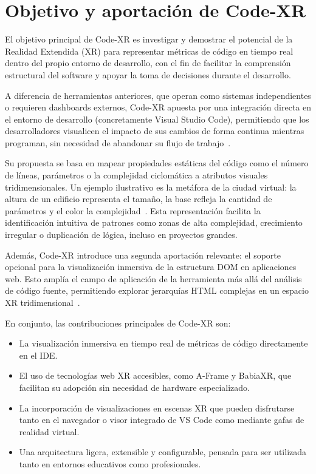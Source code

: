 \documentclass[a4paper, 12pt]{book}
\begin{document}
\section{Objetivo y aportación de Code-XR}
\label{sec:objetivo}

El objetivo principal de Code-XR es investigar y demostrar el potencial de la Realidad Extendida (XR) para representar métricas de código en tiempo real dentro del propio entorno de desarrollo, con el fin de facilitar la comprensión estructural del software y apoyar la toma de decisiones durante el desarrollo.

A diferencia de herramientas anteriores, que operan como sistemas independientes o requieren dashboards externos, Code-XR apuesta por una integración directa en el entorno de desarrollo (concretamente Visual Studio Code), permitiendo que los desarrolladores visualicen el impacto de sus cambios de forma continua mientras programan, sin necesidad de abandonar su flujo de trabajo~\cite{wettel2007visualizing, fittkau2015exploring}.

Su propuesta se basa en mapear propiedades estáticas del código como el número de líneas, parámetros o la complejidad ciclomática a atributos visuales tridimensionales. Un ejemplo ilustrativo es la metáfora de la ciudad virtual: la altura de un edificio representa el tamaño, la base refleja la cantidad de parámetros y el color la complejidad~\cite{wettel2007visualizing}. Esta representación facilita la identificación intuitiva de patrones como zonas de alta complejidad, crecimiento irregular o duplicación de lógica, incluso en proyectos grandes.

Además, Code-XR introduce una segunda aportación relevante: el soporte opcional para la visualización inmersiva de la estructura DOM en aplicaciones web. Esto amplía el campo de aplicación de la herramienta más allá del análisis de código fuente, permitiendo explorar jerarquías HTML complejas en un espacio XR tridimensional~\cite{moreno2024enhancing}.

En conjunto, las contribuciones principales de Code-XR son:

\begin{itemize}
    \item La visualización inmersiva en tiempo real de métricas de código directamente en el IDE.
    \item El uso de tecnologías web XR accesibles, como A-Frame y BabiaXR, que facilitan su adopción sin necesidad de hardware especializado.
    \item La incorporación de visualizaciones en escenas XR que pueden disfrutarse tanto en el navegador o visor integrado de VS Code como mediante gafas de realidad virtual.
    \item Una arquitectura ligera, extensible y configurable, pensada para ser utilizada tanto en entornos educativos como profesionales.
\end{itemize}
\end{document}
